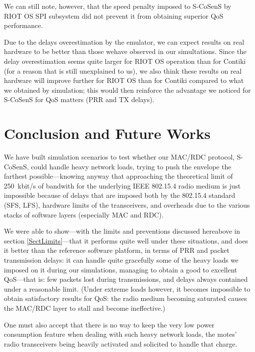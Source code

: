 \documentclass[conference]{IEEEtran}
\begin{document}
We can still note, however, that the speed penalty imposed to S-CoSenS by
RIOT OS SPI subsystem did not prevent it from obtaining superior QoS
performance.

Due to the delays overestimation by the emulator, we can expect results on
real hardware to be better than those wehave observed in our simultations.
Since the delay overestimation seems quite larger for RIOT OS operation
than for Contiki (for a reason that is still unexplained to us),
we also think these results on real hardware will improve further
for RIOT OS than for Contiki compared to what we obtained by simulation;
this would then reinforce the advantage we noticed for S-CoSenS for
QoS matters (PRR and TX delays).



\section{Conclusion and Future Works}

We have built simulation scenarios to test whether our MAC/RDC protocol,
S-CoSenS, could handle heavy network loads, trying to push the envelope
the farthest possible---knowing anyway that approaching the theoretical
limit of 250~kbit/s of bandwith for the underlying IEEE 802.15.4 radio
medium is just impossible because of delays that are imposed both by
the 802.15.4 standard (SFS, LFS), hardware limits of the transceivers,
and overheads due to the various stacks of software layers (especially
MAC and RDC).

We were able to show---with the limits and preventions discussed hereabove
in section \ref{SectLimits}---that it performs quite well under these
situations, and does it better than the reference software platform, in terms
of PRR and packet transmission delays: it can handle quite gracefully some of
the heavy loads we imposed on it during our simulations, managing to obtain
a good to excellent QoS---that is: few packets lost during transmissions,
and delays always contained under a reasonable limit.
(Under extreme loads however, it becomes impossible to obtain satisfactory
results for QoS: the radio medium becoming saturated causes the MAC/RDC
layer to stall and become ineffective.)

One must also accept that there is no way to keep the very low power
consumption feature when dealing with such heavy network loads, the
motes' radio transceivers being heavily activated and solicited to
handle that charge.
\end{document}
